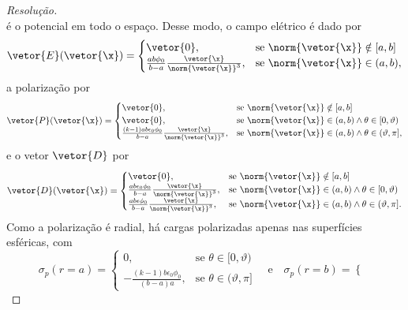 \begin{proof}[Resolução]
\begin{equation*}
    \end{equation*}
    é o potencial em todo o espaço. Desse modo, o campo elétrico é dado por
    \begin{equation*}
        \vetor{E}(\vetor{\x}) = \begin{cases}
            \vetor{0},&\text{se }\norm{\vetor{\x}}\notin [a,b]\\
            \frac{ab\phi_0}{b-a}\frac{\vetor{\x}}{\norm{\vetor{\x}}^3},&\text{se }\norm{\vetor{\x}}\in(a,b),
        \end{cases}
    \end{equation*}
    a polarização por
    \begin{equation*}
        \vetor{P}(\vetor{\x}) = \begin{cases}
            \vetor{0},&\text{se }\norm{\vetor{\x}}\notin[a,b]\\
            \vetor{0},&\text{se }\norm{\vetor{\x}}\in(a,b)\land \theta \in [0, \vartheta)\\
            \frac{(k-1)ab\epsilon_0 \phi_0}{b-a}\frac{\vetor{\x}}{\norm{\vetor{\x}}^3},&\text{se }\norm{\vetor{\x}}\in(a,b)\land \theta \in (\vartheta, \pi],
        \end{cases}
    \end{equation*}
    e o vetor \(\vetor{D}\) por
    \begin{equation*}
        \vetor{D}(\vetor{\x}) = \begin{cases}
            \vetor{0},&\text{se }\norm{\vetor{\x}}\notin[a,b]\\
            \frac{ab\epsilon_0 \phi_0}{b-a}\frac{\vetor{\x}}{\norm{\vetor{\x}}^3},&\text{se }\norm{\vetor{\x}}\in(a,b)\land \theta \in [0,\vartheta)\\
            \frac{ab\epsilon \phi_0}{b-a}\frac{\vetor{\x}}{\norm{\vetor{\x}}^3},&\text{se }\norm{\vetor{\x}}\in(a,b)\land \theta \in (\vartheta, \pi].
        \end{cases}
    \end{equation*}
    Como a polarização é radial, há cargas polarizadas apenas nas superfícies esféricas, com
    \begin{equation*}
        \sigma_p(r = a) = \begin{cases}
            0,&\text{se }\theta \in [0, \vartheta)\\
            -\frac{(k - 1)b \epsilon_0 \phi_0}{(b - a)a}, &\text{se }\theta \in (\vartheta, \pi]
        \end{cases}
        \quad\text{e}\quad
        \sigma_p(r = b) = \begin{cases}

\end{cases}
\end{equation*}
\end{proof}
